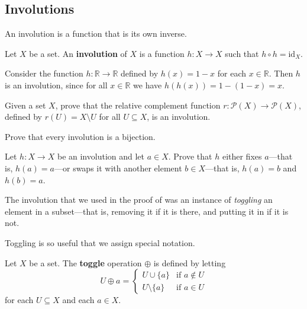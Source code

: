 \subsection*{Involutions}

An involution is a function that is its own inverse.

\begin{definition}
\label{defInvolution}
Let $X$ be a set. An \textbf{involution} of $X$ is a function $h : X \to X$ such that $h \circ h = \mathrm{id}_X$.
\end{definition}

\begin{example}
Consider the function $h : \mathbb{R} \to \mathbb{R}$ defined by $h(x) = 1-x$ for each $x \in \mathbb{R}$. Then $h$ is an involution, since for all $x \in \mathbb{R}$ we have $h(h(x)) = 1-(1-x) = x$.
\end{example}

\begin{exercise}
Given a set $X$, prove that the relative complement function $r : \mathcal{P}(X) \to \mathcal{P}(X)$, defined by $r(U) = X \setminus U$ for all $U \subseteq X$, is an involution.
\end{exercise}

\begin{exercise}
Prove that every involution is a bijection.
\end{exercise}

\begin{exercise}
Let $h : X \to X$ be an involution and let $a \in X$. Prove that $h$ either fixes $a$---that is, $h(a)=a$---or swaps it with another element $b \in X$---that is, $h(a)=b$ and $h(b)=a$.
\end{exercise}

The involution that we used in the proof of  was an instance of \textit{toggling} an element in a subset---that is, removing it if it is there, and putting it in if it is not.

Toggling is so useful that we assign special notation.

\begin{definition}
\label{defToggle}
Let $X$ be a set. The \textbf{toggle} operation $\oplus$  is defined by letting
\[ U \oplus a = \begin{cases} U \cup \{ a \} & \text{if } a \not\in U \\ U \setminus \{ a \} & \text{if } a \in U \end{cases} \]
for each $U \subseteq X$ and each $a \in X$.
\end{definition}

